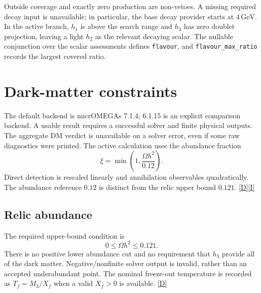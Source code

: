 \documentclass[11pt,a4paper]{article}
\newcommand{\code}[1]{\ifmmode\mbox{\ttfamily\detokenize{#1}}\else\nolinkurl{#1}\fi}
\newcommand{\src}[1]{\hyperlink{src:#1}{\textsf{[#1]}}}
\newcommand{\GeV}{\,\mathrm{GeV}}
\begin{document}
Outside coverage and exactly zero production are non-vetoes. A missing
required decay input is unavailable; in particular, the base decay provider
starts at $4\GeV$. In the active branch, $h_1$ is above the search range
and $h_3$ has zero doublet projection, leaving a light $h_2$ as the relevant
decaying scalar. The nullable conjunction over the scalar assessments
defines \code{flavour}, and \code{flavour_max_ratio} records the largest
covered ratio.

\section{Dark-matter constraints}
\label{sec:dm}
The default backend is micrOMEGAs 7.1.4; 6.1.15 is an explicit comparison
backend. A usable result requires a successful solver and finite physical
outputs. The aggregate DM verdict is unavailable on a solver error, even
if some raw diagnostics were printed. The active calculation uses the
abundance fraction
\begin{equation}
 \xi=\min\left(1,\frac{\Omega h^2}{0.12}\right).
 \label{eq:xi}
\end{equation}
Direct detection is rescaled linearly and annihilation observables
quadratically. The abundance reference $0.12$ is distinct from the relic
upper bound $0.121$. \src{D}\src{I}

\subsection{Relic abundance}
The required upper-bound condition is
\begin{equation}
 0\le\Omega h^2\le0.121.
\end{equation}
There is no positive lower abundance cut and no requirement that $h_3$
provide all of the dark matter. Negative/nonfinite solver output is invalid,
rather than an accepted underabundant point. The nominal freeze-out
temperature is recorded as $T_f=M_3/X_f$ when a valid $X_f>0$ is available.
\src{D}
\end{document}
